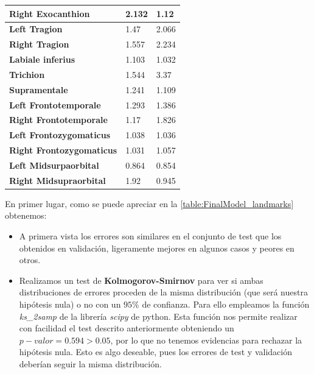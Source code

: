 \begin{table}[!ht]
\begin{tabular}{|l|l|l|}
                \textbf{Right Exocanthion} & 2.132 & \cellcolor{green!25}1.12 \\ \hline
                \textbf{Left Tragion} & \cellcolor{green!25}1.47 & 2.066 \\ \hline
                \textbf{Right Tragion} & \cellcolor{green!25}1.557 & 2.234 \\ \hline
                \textbf{Labiale inferius} & 1.103 & \cellcolor{green!25}1.032 \\ \hline
                \textbf{Trichion} & \cellcolor{green!25}1.544 & 3.37 \\ \hline
                \textbf{Supramentale} & 1.241 & \cellcolor{green!25}1.109 \\ \hline
                \textbf{Left Frontotemporale} & \cellcolor{green!25}1.293 & 1.386 \\ \hline
                \textbf{Right Frontotemporale} & \cellcolor{green!25}1.17 & 1.826 \\ \hline
                \textbf{Left Frontozygomaticus} & 1.038 & \cellcolor{green!25}1.036 \\ \hline
                \textbf{Right Frontozygomaticus} & \cellcolor{green!25}1.031 & 1.057 \\ \hline
                \textbf{Left Midsurpaorbital} & 0.864 & \cellcolor{green!25}0.854 \\ \hline
                \textbf{Right Midsupraorbital} & 1.92 & \cellcolor{green!25}0.945 \\ \hline
            \end{tabular}
            \label{table:FinalModel_landmarks}
        \end{table}
        
        \medskip

        \noindent En primer lugar, como se puede apreciar en la \autoref{table:FinalModel_landmarks} obtenemos: 

        \begin{itemize}
            \item A primera vista los errores son similares en el conjunto de test que los obtenidos en validación, ligeramente mejores en algunos casos y peores en otros.  
            \item Realizamos un test de \textbf{Kolmogorov-Smirnov} para ver si ambas distribuciones de errores proceden de la misma distribución (que será nuestra hipótesis nula) o no con un $95\%$ de confianza. Para ello empleamos la función \textit{ks\_2samp
            } de la librería \textit{scipy} de python. Esta función nos permite realizar con facilidad el test descrito anteriormente obteniendo un $p-valor=0.594 > 0.05$, por lo que no tenemos evidencias para rechazar la hipótesis nula. Esto es algo deseable, pues los errores de test y validación  deberían seguir la misma distribución.

        \end{itemize}

